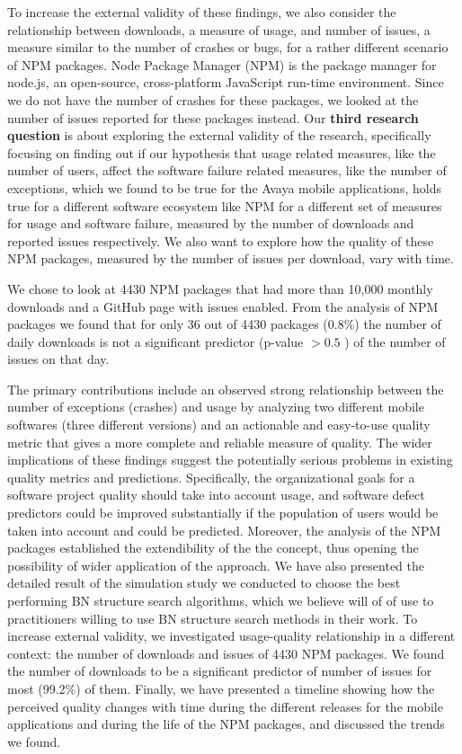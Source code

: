 \documentclass[smallcondensed]{svjour3}     %
\begin{document}
To increase the external validity of these findings, we also consider
the relationship between downloads, a measure of usage, and number of 
issues, a measure similar to the number of crashes or bugs, for a rather
different scenario of NPM packages. Node Package Manager (NPM) is
the package manager for node.js, an open-source, cross-platform
JavaScript run-time environment.  Since we do not have the number of
crashes for these packages, we looked at the number of issues
reported for these packages instead. Our \textbf{third research question} is about
exploring the external validity of the research, specifically focusing on finding out
if our hypothesis that usage related measures, like the number of users, affect the 
software failure related measures, like the number of exceptions, which we found to be 
true for the Avaya mobile applications, holds true for a different software ecosystem
like NPM for a different set of measures for usage and software failure, measured by 
the number of downloads and reported issues respectively. We also want to explore 
how the quality of these NPM packages, measured by the number of issues per download,
vary with time.

 We chose to look at 4430 NPM packages
that had more than 10,000 monthly downloads and a GitHub page with issues enabled.
From the analysis of NPM packages we found that for only 36 out of
4430 packages (0.8\%) the number of daily downloads is not a
significant predictor (p-value $> 0.5$ ) of the number of issues on
that day. 

The primary contributions include an observed strong
relationship between the number of exceptions (crashes) and usage by
analyzing two different mobile softwares (three different versions)
and an actionable and easy-to-use quality metric that gives a more
complete and reliable measure of quality. The wider implications of
these findings suggest the potentially serious problems in existing
quality metrics and predictions. Specifically, the organizational
goals for a software project quality should take into account usage,
and software defect predictors could be improved substantially if
the population of users would be taken into account and could be
predicted. Moreover, the analysis of the NPM packages established the
extendibility of the the concept, thus opening the possibility of
wider application of the approach. We have also presented the 
detailed result of the simulation study
we conducted to choose the best performing BN structure search
algorithms, which we believe will of of use to practitioners willing
to use BN structure search methods in their work. To increase
external validity, we investigated usage-quality relationship in a
different context: the number of downloads and issues of 4430 NPM
packages. We found the number of downloads to be a significant
predictor of number of issues for most (99.2\%) of them. Finally, we
have presented a timeline showing how the perceived quality changes
with time during the different releases for the mobile applications
and during the life of the NPM packages, and discussed the trends we
found.
\end{document}
